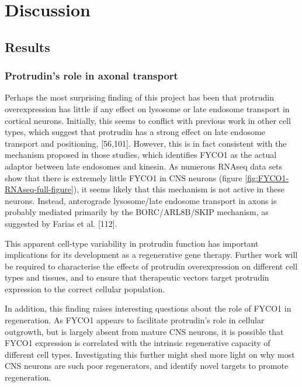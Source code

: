 \documentclass[
  12pt,
  a4paper,
]{book}
\begin{document}
\chapter*{Discussion}\label{DISCUSSION}

\setcounter{chapter}{4}
\setcounter{section}{0}
\setcounter{figure}{0}

\section{Results}\label{results-3}

\subsection{Protrudin's role in axonal transport}\label{protrudins-role-in-axonal-transport}

Perhaps the most surprising finding of this project has been that protrudin overexpression has little if any effect on lysosome or late endosome transport in cortical neurons. Initially, this seems to conflict with previous work in other cell types, which suggest that protrudin has a strong effect on late endosome transport and positioning, {[}56,101{]}. However, this is in fact consistent with the mechanism proposed in those studies, which identifies FYCO1 as the actual adaptor between late endosomes and kinesin. As numerous RNAseq data sets show that there is extremely little FYCO1 in CNS neurons (figure \ref{fig:FYCO1-RNAseq-full-figure}), it seems likely that this mechanism is not active in these neurons. Instead, anterograde lysosome/late endosome transport in axons is probably mediated primarily by the BORC/ARL8B/SKIP mechanism, as suggested by Farias et al. {[}112{]}.

This apparent cell-type variability in protrudin function has important implications for its development as a regenerative gene therapy. Further work will be required to characterise the effects of protrudin overexpression on different cell types and tissues, and to ensure that therapeutic vectors target protrudin expression to the correct cellular population.

In addition, this finding raises interesting questions about the role of FYCO1 in regeneration. As FYCO1 appears to facilitate protrudin's role in cellular outgrowth, but is largely absent from mature CNS neurons, it is possible that FYCO1 expression is correlated with the intrinsic regenerative capacity of different cell types. Investigating this further might shed more light on why most CNS neurons are such poor regenerators, and identify novel targets to promote regeneration.
\end{document}
